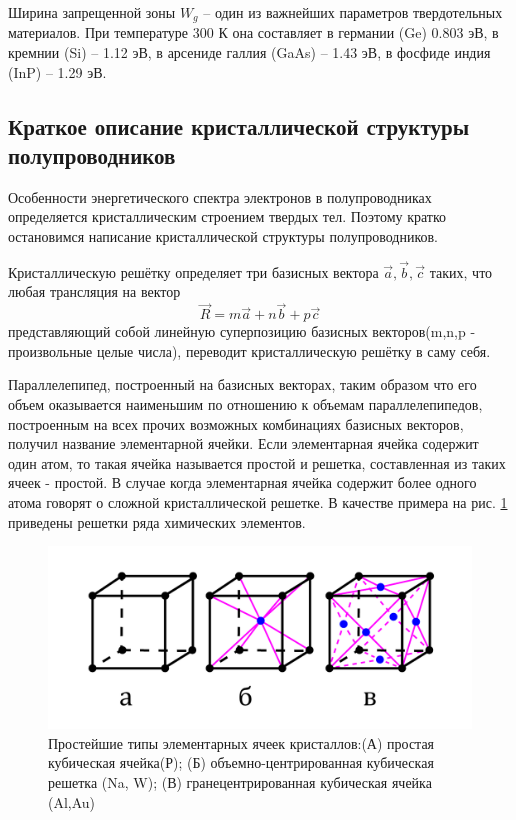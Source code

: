 Ширина запрещенной зоны $W_g$  – один из важнейших параметров твердотельных материалов.
При температуре 300 К она составляет в германии (Ge) 0.803 эВ, в кремнии (Si) – 1.12 эВ, в арсениде галлия (GaAs) – 1.43
эВ, в фосфиде индия (InP) – 1.29 эВ.

\subsection{Краткое описание кристаллической структуры полупроводников}
Особенности энергетического спектра электронов в полупроводниках определяется кристаллическим строением твердых тел.
Поэтому кратко остановимся написание кристаллической структуры полупроводников.

Кристаллическую решётку определяет три базисных вектора $\vec{a},\vec{b},\vec{c}$ таких, что любая трансляция на вектор
\begin{equation}
	\vec{R} = m \vec{a} + n \vec{b} + p \vec{c}
	\label{eq:1.1}
\end{equation}
представляющий собой линейную суперпозицию базисных векторов(m,n,p - произвольные целые числа), переводит
кристаллическую решётку в саму себя. 

Параллелепипед, построенный на базисных векторах, таким образом что его объем оказывается наименьшим по отношению к
объемам параллелепипедов, построенным на всех прочих возможных комбинациях базисных векторов, получил название
элементарной ячейки. Если элементарная ячейка содержит один атом, то такая ячейка называется простой и решетка,
составленная из таких ячеек - простой. В случае когда элементарная ячейка содержит более одного атома говорят о сложной
кристаллической решетке. В качестве примера на рис. \ref{fig:1.2} приведены решетки ряда химических элементов.

\begin{figure}[h!]
	\centering
	\includegraphics[width = .8\linewidth]{img/12}
	\caption{Простейшие типы элементарных ячеек кристаллов:(А) простая кубическая ячейка(Р); (Б) объемно-центрированная кубическая решетка (Na, W); (В) гранецентрированная кубическая ячейка (Al,Au)}
	\label{fig:1.2}
\end{figure}

